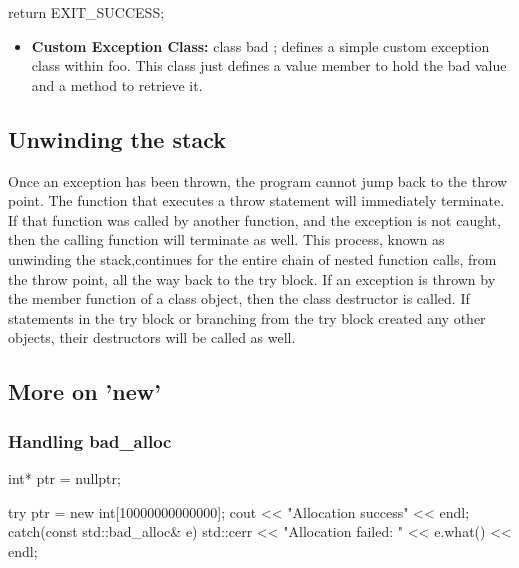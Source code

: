 \documentclass{report}
\begin{document}
\begin{concept}
\begin{cppcode}
{            return EXIT_SUCCESS; 
        }
    \end{cppcode}
    \bigbreak \noindent 
    \begin{itemize}
        \item \textbf{Custom Exception Class:} class bad {}; defines a simple custom exception class within foo. This class just defines a value member to hold the bad value and a method to retrieve it.
    \end{itemize}

    \pagebreak 
    \subsection{Unwinding the stack}
    \bigbreak \noindent 
    \begin{concept}
        Once an exception has been thrown, the program cannot jump back to the throw point.
        The function that executes a throw statement will immediately terminate. If that function was called by another function, and the exception is not caught, then the calling
        function will terminate as well. This process, known as unwinding the stack,continues
        for the entire chain of nested function calls, from the throw point, all the way back to
        the try block.
        \bigbreak \noindent 
        If an exception is thrown by the member function of a class object, then the class destructor
        is called. If statements in the try block or branching from the try block created any other
        objects, their destructors will be called as well. 
    \end{concept}

    \bigbreak \noindent 
    \subsection{More on 'new'}
    \bigbreak \noindent 
    \subsubsection{Handling bad\_alloc}
    \bigbreak \noindent 
    \begin{cppcode}
        int* ptr = nullptr;

        try {
            ptr = new int[10000000000000];
            cout << "Allocation success" << endl;
        } catch(const std::bad_alloc& e) {
        }
        std::cerr << "Allocation failed: " << e.what() << endl;
    \end{cppcode}


\end{concept}
\end{document}
